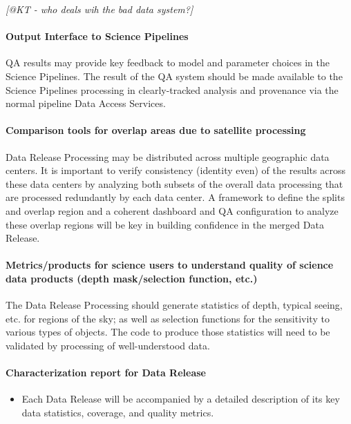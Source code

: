 \emph{[@KT - who deals wih the bad data system?]}

\paragraph{Output Interface to Science Pipelines}
\label{sec:qaOutputInterfaceSciencePipelines}

QA results may provide key feedback to model and parameter choices in the Science Pipelines.  The result of the QA system should be made available to the Science Pipelines processing in clearly-tracked analysis and provenance via the normal pipeline Data Access Services.

\paragraph{Comparison tools for overlap areas due to satellite processing}
\label{sec:qaComparisonSatelliteDataCenters}

Data Release Processing may be distributed across multiple geographic data centers.  It is important to verify consistency (identity even) of the results across these data centers by analyzing both subsets of the overall data processing that are processed redundantly by each data center. A framework to define the splits and overlap region and a coherent dashboard and QA configuration to analyze these overlap regions will be key in building confidence in the merged Data Release. 

\paragraph{Metrics/products for science users to understand quality of science data products (depth mask/selection function, etc.)}
\label{sec:qaScienceUsersMetrics}

The Data Release Processing should generate statistics of depth, typical seeing, etc. for regions of the sky; as well as selection functions for the sensitivity to various types of objects.  The code to produce those statistics will need to be validated by processing of well-understood data.

\paragraph{Characterization report for Data Release}
\label{sec:qaCharacterizationReportDrp}
\begin{itemize}
\item Each Data Release will be accompanied by a detailed description of its key data statistics, coverage, and quality metrics.
\end{itemize}

